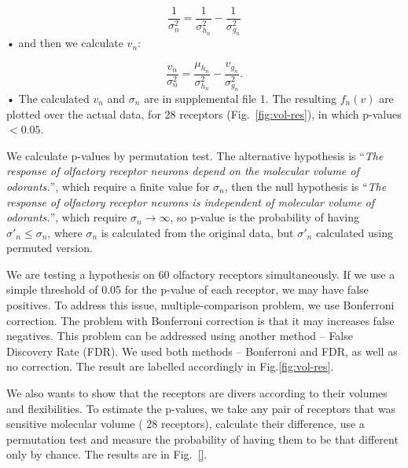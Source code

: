 \documentclass[11pt]{paper} %
\newcommand{\numberofreceptors}{ 28 }
\begin{document}
\begin{equation}
	\frac{1}{\sigma_n^2} = \frac{1}{\sigma^2_{h_n}}  - \frac{1}{\sigma^2_{g_n}}
\end{equation}•
and then we calculate $v_n$: 

\begin{equation}
	\frac{v_n}{\sigma_n^2}  =    \frac{\mu_{h_n}}{\sigma^2_{h_n}} - \frac{v_{g_n}}{\sigma^2_{g_n}}.
\end{equation}•
The calculated $v_n$ and $\sigma_n$ are in supplemental file 1. 
The resulting $f_n(v)$ are plotted over the actual data, for \numberofreceptors receptors (Fig.~\ref{fig:vol-res}),
in which p-values $<0.05$. 

We calculate p-values by permutation test. 
The alternative hypothesis is 
``{\it The response of olfactory receptor neurons depend on the molecular volume of odorants.}'', 
which require  a finite value for $\sigma_n$, 
then the null hypothesis is 
``{\it The response of olfactory receptor neurons is independent of molecular volume of odorants.}'',
which require $\sigma_n \rightarrow \infty$, 
so p-value is the probability of having $\sigma'_n\leq\sigma_n$, 
where $\sigma_n$ is calculated from the original data, but $\sigma'_n$ calculated using permuted version.

We are testing a hypothesis on 60  olfactory receptors simultaneously. 
If we use a simple threshold of 0.05 for the p-value of each receptor, we may have false positives. 
To address this issue, multiple-comparison problem, 
we use Bonferroni correction. 
The problem with Bonferroni correction is that it may increases false negatives.
This problem can be addressed using another method -- False Discovery Rate (FDR).
We used both methods -- Bonferroni and FDR, as well as no correction. 
The result are labelled accordingly in Fig.\ref{fig:vol-res}.

We also wants to show that the receptors are divers according to their volumes and flexibilities. 
To estimate the p-values, 
we take any pair of receptors that was sensitive molecular volume (\numberofreceptors receptors),
calculate their difference, 
use a permutation test and measure the probability of having them to be that different only by chance.
The results are in Fig.~\ref{}.

\end{document}
